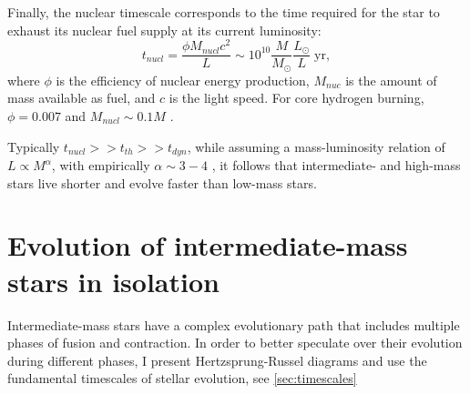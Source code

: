 Finally, the nuclear timescale corresponds to the time required for the star to exhaust its nuclear fuel supply at its current luminosity: 
\begin{equation}\label{eq:nuclear_timsecale}
    t_{nucl} = \frac{\phi M_{nucl} c^2}{L} \sim 10^{10} \frac{M}{M_{\odot}} \frac{L_{\odot}}{L} \; \text{yr},
\end{equation}
where $\phi$ is the efficiency of nuclear energy production, $M_{nuc}$ is the amount of mass available as fuel, and $c$ is the light speed. For core hydrogen burning, $\phi = 0.007$ and $M_{nucl} \sim 0.1 M$ \citep{pols2011stellar}.

Typically $t_{nucl} >> t_{th} >> t_{dyn}$, while assuming a mass-luminosity relation of $L \propto M^{\alpha}$, with empirically $\alpha \sim 3-4$ \citep{eker2015main}, it follows that intermediate- and high-mass stars live shorter and evolve faster than low-mass stars.


\section{Evolution of intermediate-mass stars in isolation}\label{sec:single_star_evolution}

Intermediate-mass stars have a complex evolutionary path that includes multiple phases of fusion and contraction. In order to better speculate over their evolution during different phases, I present Hertzsprung-Russel diagrams and use the fundamental timescales of stellar evolution, see \cref{sec:timescales}

